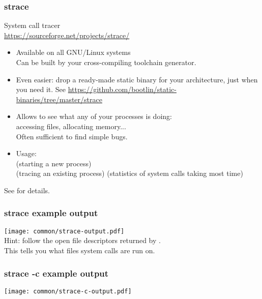 \begin{frame}
  \frametitle{strace}
  System call tracer\\
  \url{https://sourceforge.net/projects/strace/}
  \begin{itemize}
  \item Available on all GNU/Linux systems\\
    Can be built by your cross-compiling toolchain generator.
  \item Even easier: drop a ready-made static binary for your
        architecture, just when you need it. See
        \url{https://github.com/bootlin/static-binaries/tree/master/strace}
  \item Allows to see what any of your processes is doing:\\
    accessing files, allocating memory...\\
    Often sufficient to find simple bugs.
  \item Usage:\\
     (starting a new process)\\
     (tracing an existing process)
     (statistics of system calls taking most time)
  \end{itemize}
  See  for details.
\end{frame}

\begin{frame}[fragile]
  \frametitle{strace example output}
  \texttt{[image: common/strace-output.pdf]}\\
  Hint: follow the open file descriptors returned by . \\
  This tells you what files system calls are run on.
\end{frame}

\begin{frame}[fragile]
  \frametitle{strace -c example output}
  \texttt{[image: common/strace-c-output.pdf]}
\end{frame}
